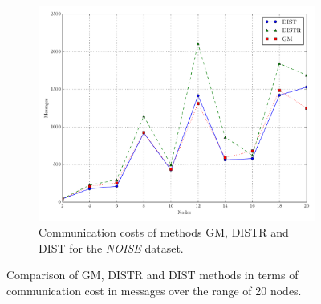 \begin{figure}[H]
\begin{subfigure}{0.32\textwidth}%
  \includegraphics[width=\linewidth]{img/matching_msg_noisyinterweaving.pdf}
  \caption{Communication costs of methods GM, DISTR and DIST for the \emph{NOISE} dataset.}
\end{subfigure}
\vspace{0.5cm}
\caption{Comparison of GM, DISTR and DIST methods in terms of communication cost in messages over the range of 20 nodes.} \label{fig:matchingComp-msgs}
\end{figure}

